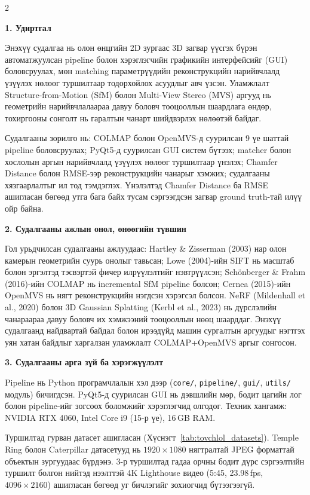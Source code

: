 \begin{multicols}{2}
\setlength{\parskip}{5pt}
\sloppy

\noindent\textbf{1. Удиртгал}

Энэхүү судалгаа нь олон өнцгийн 2D зургаас 3D загвар үүсгэх бүрэн автоматжуулсан pipeline болон хэрэглэгчийн графикийн интерфейсийг (GUI) боловсруулах, мөн matching параметрүүдийн реконструкцийн нарийвчлалд үзүүлэх нөлөөг туршилтаар тодорхойлох асуудлыг авч үзсэн. Уламжлалт Structure-from-Motion (SfM) болон Multi-View Stereo (MVS) аргууд нь геометрийн нарийвчлалаараа давуу боловч тооцооллын шаардлага өндөр, тохиргооны сонголт нь гаралтын чанарт шийдвэрлэх нөлөөтэй байдаг.

Судалгааны зорилго нь: COLMAP болон OpenMVS-д суурилсан 9 үе шаттай pipeline боловсруулах; PyQt5-д суурилсан GUI систем бүтээх; matcher болон хослолын аргын нарийвчлалд үзүүлэх нөлөөг туршилтаар үнэлэх; Chamfer Distance болон RMSE-ээр реконструкцийн чанарыг хэмжих; судалгааны хязгаарлалтыг ил тод тэмдэглэх. Үнэлэлтэд Chamfer Distance ба RMSE ашигласан бөгөөд утга бага байх тусам сэргээгдсэн загвар ground truth-тай илүү ойр байна.

\noindent\textbf{2. Судалгааны ажлын онол, өнөөгийн түвшин}

Гол урьдчилсан судалгааны ажлуудаас: Hartley \& Zisserman (2003) нар олон камерын геометрийн суурь онолыг тавьсан; Lowe (2004)-ийн SIFT нь масштаб болон эргэлтэд тэсвэртэй фичер илрүүлэлтийг нэвтрүүлсэн; Sch{\"o}nberger \& Frahm (2016)-ийн COLMAP нь incremental SfM pipeline болсон; Cernea (2015)-ийн OpenMVS нь нягт реконструкцийн нэгдсэн хэрэгсэл болсон. NeRF (Mildenhall et al., 2020) болон 3D Gaussian Splatting (Kerbl et al., 2023) нь дүрслэлийн чанараараа давуу боловч их хэмжээний тооцооллын нөөц шаарддаг. Энэхүү судалгаанд найдвартай байдал болон ирээдүйд машин сургалтын аргуудыг нэгтгэх уян хатан байдлыг харгалзан уламжлалт COLMAP+OpenMVS аргыг сонгосон.

\noindent\textbf{3. Судалгааны арга зүй ба хэрэгжүүлэлт}

Pipeline нь Python програмчлалын хэл дээр (\texttt{core/}, \texttt{pipeline/}, \texttt{gui/}, \texttt{utils/} модуль) бичигдсэн. PyQt5-д суурилсан GUI нь дэвшлийн мөр, бодит цагийн лог болон pipeline-ийг зогсоох боломжийг хэрэглэгчид олгодог. Техник хангамж: NVIDIA RTX 4060, Intel Core i9 (15-р үе), 16\,GB RAM.

Туршилтад гурван датасет ашигласан (Хүснэгт~\ref{tab:tovchlol_datasets}). Temple Ring болон Caterpillar датасетууд нь $1920\times1080$ нягтралтай JPEG форматтай объектын зургуудаас бүрдэнэ. 3-р туршилтад гадаа орчны бодит дүрс сэргээлтийн туршилт болгон нийтэд нээлттэй 4K Lighthouse видео (5:45, 23.98\,fps, $4096\times2160$) ашигласан бөгөөд уг бичлэгийг зохиогчид бүтээгээгүй.


\end{multicols}
